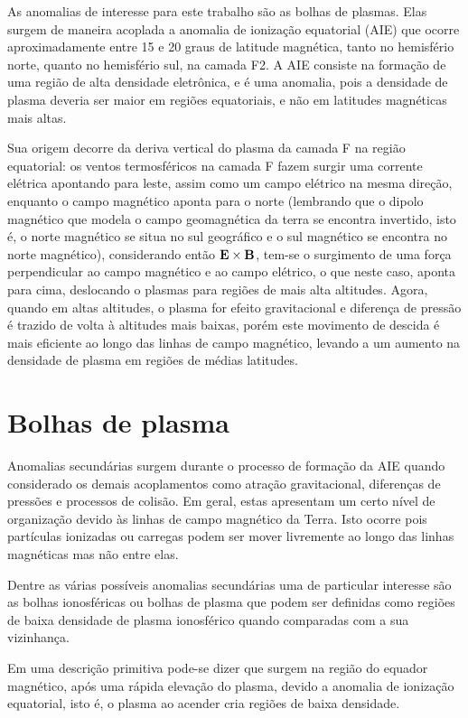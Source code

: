 As anomalias de interesse para este trabalho são as bolhas de plasmas. Elas surgem de maneira acoplada a anomalia de ionização equatorial (AIE) que ocorre aproximadamente entre 15 e 20 graus de latitude magnética, tanto no hemisfério norte, quanto no hemisfério sul, na camada F2. A AIE consiste na formação de uma região de alta densidade eletrônica, e é uma anomalia, pois a densidade de plasma deveria ser maior em regiões equatoriais, e não em latitudes magnéticas mais altas.

Sua origem decorre da deriva vertical do plasma da camada F na região equatorial: os ventos termosféricos na camada F fazem surgir uma corrente elétrica apontando para leste, assim como um campo elétrico na mesma direção, enquanto o campo magnético aponta para o norte (lembrando que o dipolo magnético que modela o campo geomagnética da terra se encontra invertido, isto é, o norte magnético se situa no sul geográfico e o sul magnético se encontra no norte magnético), considerando então ${\bf E}\times{\bf B}$, tem-se o surgimento de uma força perpendicular ao campo magnético e ao campo elétrico, o que neste caso, aponta para cima, deslocando o plasmas para regiões de mais alta altitudes. Agora, quando em altas altitudes, o plasma for efeito gravitacional e diferença de pressão é trazido de volta à altitudes mais baixas, porém este movimento de descida é mais eficiente ao longo das linhas de campo magnético, levando a um aumento na densidade de plasma em regiões de médias latitudes.

\section{Bolhas de plasma}

Anomalias secundárias surgem durante o processo de formação da AIE quando considerado os demais acoplamentos como atração gravitacional, diferenças de pressões e processos de colisão. Em geral, estas apresentam um certo nível de organização devido às linhas de campo magnético da Terra. Isto ocorre pois partículas ionizadas ou carregas podem ser mover livremente ao longo das linhas magnéticas mas não entre elas.

Dentre as várias possíveis anomalias secundárias uma de particular interesse são as bolhas ionosféricas ou bolhas de plasma que podem ser definidas como regiões de baixa densidade de plasma ionosférico quando comparadas com a sua vizinhança. 

Em uma descrição primitiva pode-se dizer que surgem na região do equador magnético, após uma rápida elevação do plasma, devido a anomalia de ionização equatorial, isto é, o plasma ao acender cria regiões de baixa densidade.

